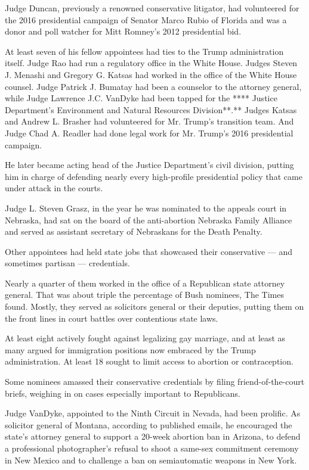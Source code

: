Judge Duncan, previously a renowned conservative litigator, had
volunteered for the 2016 presidential campaign of Senator Marco Rubio of
Florida and was a donor and poll watcher for Mitt Romney's 2012
presidential bid.

At least seven of his fellow appointees had ties to the Trump
administration itself. Judge Rao had run a regulatory office in the
White House. Judges Steven J. Menashi and Gregory G. Katsas had worked
in the office of the White House counsel. Judge Patrick J. Bumatay had
been a counselor to the attorney general, while Judge Lawrence J.C.
VanDyke had been tapped for the **** Justice Department's Environment
and Natural Resources Division**.** Judges Katsas and Andrew L. Brasher
had volunteered for Mr. Trump's transition team. And Judge Chad A.
Readler had done legal work for Mr. Trump's 2016 presidential campaign.

He later became acting head of the Justice Department's civil division,
putting him in charge of defending nearly every high-profile
presidential policy that came under attack in the courts.

Judge L. Steven Grasz, in the year he was nominated to the appeals court
in Nebraska, had sat on the board of the anti-abortion Nebraska Family
Alliance and served as assistant secretary of Nebraskans for the Death
Penalty.

Other appointees had held state jobs that showcased their conservative
--- and sometimes partisan --- credentials.

Nearly a quarter of them worked in the office of a Republican state
attorney general. That was about triple the percentage of Bush nominees,
The Times found. Mostly, they served as solicitors general or their
deputies, putting them on the front lines in court battles over
contentious state laws.

At least eight actively fought against legalizing gay marriage, and at
least as many argued for immigration positions now embraced by the Trump
administration. At least 18 sought to limit access to abortion or
contraception.

Some nominees amassed their conservative credentials by filing
friend-of-the-court briefs, weighing in on cases especially important to
Republicans.

Judge VanDyke, appointed to the Ninth Circuit in Nevada, had been
prolific. As solicitor general of Montana, according to published
emails, he encouraged the state's attorney general to support a 20-week
abortion ban in Arizona, to defend a professional photographer's refusal
to shoot a same-sex commitment ceremony in New Mexico and to challenge a
ban on semiautomatic weapons in New York.

